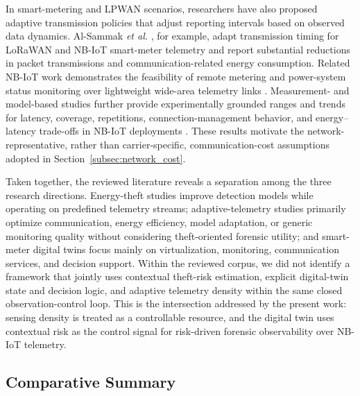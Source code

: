 \documentclass{ieeeaccess}
\begin{document}
In smart-metering and LPWAN scenarios, researchers have also proposed adaptive transmission policies that adjust reporting intervals based on observed data dynamics. Al-Sammak \textit{et al.} \cite{b29}, for example, adapt transmission timing for LoRaWAN and NB-IoT smart-meter telemetry and report substantial reductions in packet transmissions and communication-related energy consumption. Related NB-IoT work demonstrates the feasibility of remote metering and power-system status monitoring over lightweight wide-area telemetry links \cite{b30,b31}. Measurement- and model-based studies further provide experimentally grounded ranges and trends for latency, coverage, repetitions, connection-management behavior, and energy--latency trade-offs in NB-IoT deployments \cite{b32,b33,b34,b35}. These results motivate the network-representative, rather than carrier-specific, communication-cost assumptions adopted in Section~\ref{subsec:network_cost}.

Taken together, the reviewed literature reveals a separation among the three research directions. Energy-theft studies improve detection models while operating on predefined telemetry streams; adaptive-telemetry studies primarily optimize communication, energy efficiency, model adaptation, or generic monitoring quality without considering theft-oriented forensic utility; and smart-meter digital twins focus mainly on virtualization, monitoring, communication services, and decision support. Within the reviewed corpus, we did not identify a framework that jointly uses contextual theft-risk estimation, explicit digital-twin state and decision logic, and adaptive telemetry density within the same closed observation-control loop. This is the intersection addressed by the present work: sensing density is treated as a controllable resource, and the digital twin uses contextual risk as the control signal for risk-driven forensic observability over NB-IoT telemetry.

\subsection{Comparative Summary}
\end{document}
